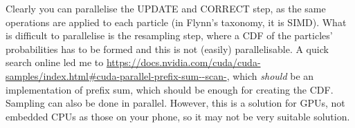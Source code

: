 \documentclass[12pt]{article}
\begin{document}
Clearly you can parallelise the UPDATE and CORRECT step, as the same operations
are applied to each particle (in Flynn's taxonomy, it is SIMD). What is
difficult to parallelise is the resampling step, where a CDF of the particles'
probabilities has to be formed and this is not (easily) parallelisable. A quick
search online led me to
\url{https://docs.nvidia.com/cuda/cuda-samples/index.html#cuda-parallel-prefix-sum--scan-},
which \textit{should} be an implementation of prefix sum, which should be
enough for creating the CDF. Sampling can also be done in parallel. However,
this is a solution for GPUs, not embedded CPUs as those on your phone, so it 
may not be very suitable solution.
\end{document}
